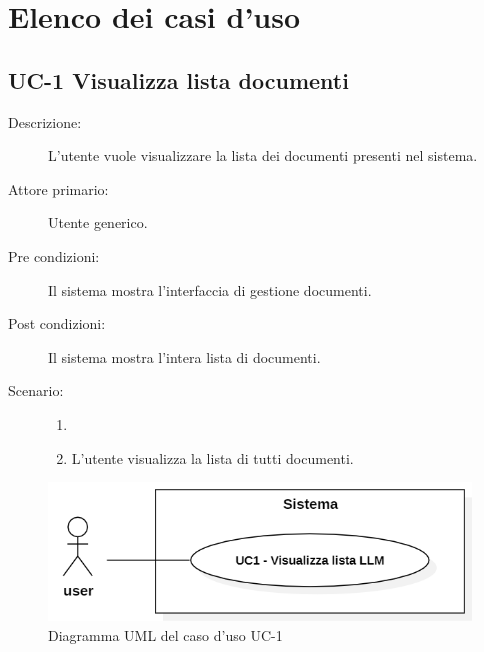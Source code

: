 \newpage

\section{Elenco dei casi d'uso}

\subsection{UC-1 Visualizza lista documenti}
\begin{description}
    \item[Descrizione:] L’utente vuole visualizzare la lista dei documenti presenti nel sistema.
    \item[Attore primario:] Utente generico.
    \item[Pre condizioni:] Il sistema mostra l’interfaccia di gestione documenti.
    \item[Post condizioni:] Il sistema mostra l’intera lista di documenti.
    \item[Scenario:] 
    \begin{enumerate}
        \item[]
        \item L’utente visualizza la lista di tutti documenti.
    \end{enumerate}
\end{description}

\begin{figure}[H]
    \centering
    \includegraphics[width=0.8\linewidth]{UC1.PNG} %
    \caption{Diagramma UML del caso d'uso UC-1}
    \label{fig:UC3}
\end{figure}

